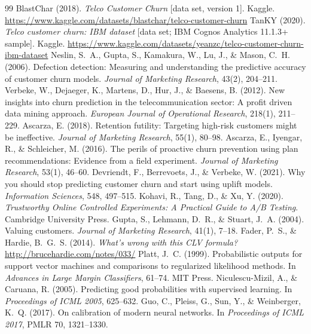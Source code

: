 \documentclass[11pt,a4paper]{article}
\begin{document}
\begin{thebibliography}{99}\small
{} BlastChar (2018). \emph{Telco Customer Churn} [data set, version 1]. Kaggle. \url{https://www.kaggle.com/datasets/blastchar/telco-customer-churn}
 TanKY (2020). \emph{Telco customer churn: IBM dataset} [data set; IBM Cognos Analytics 11.1.3+ sample]. Kaggle. \url{https://www.kaggle.com/datasets/yeanzc/telco-customer-churn-ibm-dataset}
 Neslin, S.~A., Gupta, S., Kamakura, W., Lu, J., \& Mason, C.~H. (2006). Defection detection: Measuring and understanding the predictive accuracy of customer churn models. \emph{Journal of Marketing Research}, 43(2), 204--211.
 Verbeke, W., Dejaeger, K., Martens, D., Hur, J., \& Baesens, B. (2012). New insights into churn prediction in the telecommunication sector: A profit driven data mining approach. \emph{European Journal of Operational Research}, 218(1), 211--229.
 Ascarza, E. (2018). Retention futility: Targeting high-risk customers might be ineffective. \emph{Journal of Marketing Research}, 55(1), 80--98.
 Ascarza, E., Iyengar, R., \& Schleicher, M. (2016). The perils of proactive churn prevention using plan recommendations: Evidence from a field experiment. \emph{Journal of Marketing Research}, 53(1), 46--60.
 Devriendt, F., Berrevoets, J., \& Verbeke, W. (2021). Why you should stop predicting customer churn and start using uplift models. \emph{Information Sciences}, 548, 497--515.
 Kohavi, R., Tang, D., \& Xu, Y. (2020). \emph{Trustworthy Online Controlled Experiments: A Practical Guide to A/B Testing}. Cambridge University Press.
 Gupta, S., Lehmann, D.~R., \& Stuart, J.~A. (2004). Valuing customers. \emph{Journal of Marketing Research}, 41(1), 7--18.
 Fader, P.~S., \& Hardie, B.~G.~S. (2014). \emph{What's wrong with this CLV formula?} \url{http://brucehardie.com/notes/033/}
 Platt, J.~C. (1999). Probabilistic outputs for support vector machines and comparisons to regularized likelihood methods. In \emph{Advances in Large Margin Classifiers}, 61--74. MIT Press.
 Niculescu-Mizil, A., \& Caruana, R. (2005). Predicting good probabilities with supervised learning. In \emph{Proceedings of ICML 2005}, 625--632.
 Guo, C., Pleiss, G., Sun, Y., \& Weinberger, K.~Q. (2017). On calibration of modern neural networks. In \emph{Proceedings of ICML 2017}, PMLR 70, 1321--1330.

\end{thebibliography}
\end{document}
